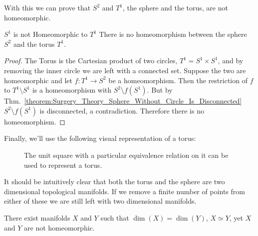 \documentclass[crop=false,class=book,oneside]{standalone}
\begin{document}
            With this we can prove that $S^{2}$ and $T^{1}$, the sphere and the
            torus, are not homeomorphic.
            \begin{ltheorem}{$S^{1}$ is not Homeomorphic to $T^{1}$}
                There is no homeomorphism between the sphere $S^{2}$ and
                the torus $T^{1}$.
            \end{ltheorem}
            \begin{proof}
                The Torus is the Cartesian product of two circles,
                $T^{1}=S^{1}\times{S}^{1}$, and by removing the inner circle we
                are left with a connected set. Suppose the two are homeomorphic and
                let $f:T^{1}\rightarrow{S}^{2}$ be a homeomorphism. Then the
                restriction of $f$ to $T^{1}\setminus{S}^{1}$ is a homeomorphism
                with $S^{2}\setminus{f}(S^{1})$. But by
                Thm.~\ref{theorem:Surgery_Theory_Sphere_Without_Circle_Is_Disconnected}
                $S^{2}\setminus{f}(S^{1})$ is disconnected, a contradiction.
                Therefore there is no homeomorphism.
            \end{proof}
            Finally, we'll use the following visual representation of a torus:
            \begin{figure}[H]
                \centering
                \captionsetup{type=figure}
                \caption[Plane Representation of a Torus]
                        {The unit square with a particular
                         equivalence relation on it can be
                         used to represent a torus.}
                \label{fig:surgery_theory_plane_%
                       representation_of_a_torus}
            \end{figure}
            It should be intuitively clear that both the torus and the sphere
            are two dimensional topological manifolds. If we remove a finite
            number of points from either of these we are still left with
            two dimensional manifolds.
            \begin{theorem}
                There exist manifolds $X$ and $Y$ such that
                $\dim(X)=\dim(Y)$, ${X}\simeq{Y}$,
                yet $X$ and $Y$ are not homeomorphic.
            \end{theorem}
\end{document}
